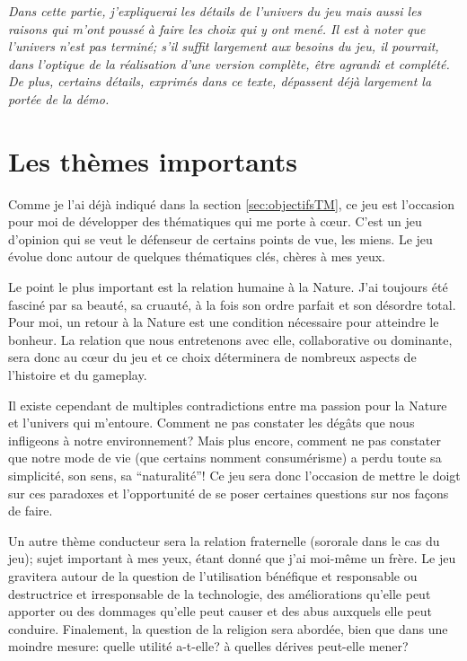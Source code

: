 \printMiniToc



\textit{Dans cette partie, j'expliquerai les détails de l'univers du jeu mais aussi les raisons qui m'ont poussé à faire les choix qui y ont mené. Il est à noter que l'univers n'est pas terminé; s'il suffit largement aux besoins du jeu, il pourrait, dans l'optique de la réalisation d'une version complète, être agrandi et complété. De plus, certains détails, exprimés dans ce texte, dépassent déjà largement la portée de la démo.}



\section{Les thèmes importants}
Comme je l'ai déjà indiqué dans la section \ref{sec:objectifsTM}, ce jeu est l'occasion pour moi de développer des thématiques qui me porte à c\oe ur. C'est un jeu d'opinion qui se veut le défenseur de certains points de vue, les miens. Le jeu évolue donc autour de quelques thématiques clés, chères à mes yeux.

Le point le plus important est la relation humaine à la Nature. J'ai toujours été fasciné par sa beauté, sa cruauté, à la fois son ordre parfait et son désordre total. Pour moi, un retour à la Nature est une condition nécessaire pour atteindre le bonheur. La relation que nous entretenons avec elle, collaborative ou dominante, sera donc au c\oe ur du jeu et ce choix déterminera de nombreux aspects de l'histoire et du gameplay.

Il existe cependant de multiples contradictions entre ma passion pour la Nature et l'univers qui m'entoure. Comment ne pas constater les dégâts que nous infligeons à notre environnement? Mais plus encore, comment ne pas constater que notre mode de vie (que certains nomment consumérisme) a perdu toute sa simplicité, son sens, sa \enquote{naturalité}! Ce jeu sera donc l'occasion de mettre le doigt sur ces paradoxes et l'opportunité de se poser certaines questions sur nos façons de faire.

Un autre thème conducteur sera la relation fraternelle (sororale dans le cas du jeu); sujet important à mes yeux, étant donné que j'ai moi-même un frère. Le jeu gravitera autour de la question de l'utilisation bénéfique et responsable ou destructrice et irresponsable de la technologie, des améliorations qu'elle peut apporter ou des dommages qu'elle peut causer et des abus auxquels elle peut conduire. Finalement, la question de la religion sera abordée, bien que dans une moindre mesure: quelle utilité a-t-elle? à quelles dérives peut-elle mener?



